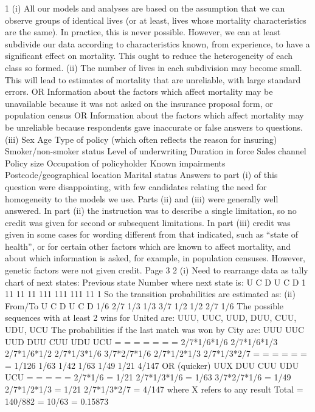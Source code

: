 \documentclass[a4paper,12pt]{article}
\begin{document}
\begin{enumerate}
1
(i)
All our models and analyses are based on the assumption that we can observe groups
of identical lives (or at least, lives whose mortality characteristics are the same).
In practice, this is never possible.
However, we can at least subdivide our data according to characteristics known, from
experience, to have a significant effect on mortality.
This ought to reduce the heterogeneity of each class so formed.
(ii)
The number of lives in each subdivision may become small. This will lead to
estimates of mortality that are unreliable, with large standard errors.
OR
Information about the factors which affect mortality may be unavailable because it
was not asked on the insurance proposal form, or population census
OR
Information about the factors which affect mortality may be unreliable because
respondents gave inaccurate or false answers to questions.
(iii)
Sex
Age
Type of policy (which often reflects the reason for insuring)
Smoker/non-smoker status
Level of underwriting
Duration in force
Sales channel
Policy size
Occupation of policyholder
Known impairments
Postcode/geographical location
Marital status
Answers to part (i) of this question were disappointing, with few candidates relating the need
for homogeneity to the models we use. Parts (ii) and (iii) were generally well answered. In
part (ii) the instruction was to describe a single limitation, so no credit was given for second
or subsequent limitations. In part (iii) credit was given in some cases for wording different
from that indicated, such as “state of health”, or for certain other factors which are known to
affect mortality, and about which information is asked, for example, in population censuses.
However, genetic factors were not given credit.
Page 3%
2
(i)
Need to rearrange data as tally chart of next states:
Previous state Number where next state is:
U
C
D
U
C
D 1
11
11
11
111
111
111
11
1
So the transition probabilities are estimated as:
(ii)
From/To U C D
U
C
D 1/6
2/7
1/3 1/3
3/7
1/2 1/2
2/7
1/6
The possible sequences with at least 2 wins for United are:
UUU, UUC, UUD, DUU, CUU, UDU, UCU
The probabilities if the last match was won by City are:
UUU
UUC
UUD
DUU
CUU
UDU
UCU
=
=
=
=
=
=
=
2/7*1/6*1/6
2/7*1/6*1/3
2/7*1/6*1/2
2/7*1/3*1/6
3/7*2/7*1/6
2/7*1/2*1/3
2/7*1/3*2/7
=
=
=
=
=
=
=
1/126
1/63
1/42
1/63
1/49
1/21
4/147
OR (quicker)
UUX
DUU
CUU
UDU
UCU
=
=
=
=
=
2/7*1/6 = 1/21
2/7*1/3*1/6 = 1/63
3/7*2/7*1/6 = 1/49
2/7*1/2*1/3 = 1/21
2/7*1/3*2/7 = 4/147
where X refers to any result
Total = 140/882 = 10/63 = 0.15873

\end{enumerate}
\end{document}
